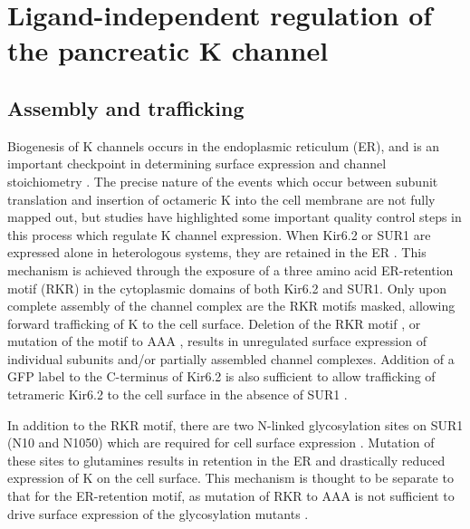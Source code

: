 \section{Ligand-independent regulation of the pancreatic K\ATP{} channel}

\subsection{Assembly and trafficking}

Biogenesis of K\ATP{} channels occurs in the endoplasmic reticulum (ER), and is an important checkpoint in determining surface expression and channel stoichiometry \cite{zerangue_new_1999-1, martin_pharmacological_2013}.
The precise nature of the events which occur between subunit translation and insertion of octameric K\ATP{} into the cell membrane are not fully mapped out, but studies have highlighted some important quality control steps in this process which regulate K\ATP{} channel expression.
When Kir6.2 or SUR1 are expressed alone in heterologous systems, they are retained in the ER \cite{zerangue_new_1999-1}.
This mechanism is achieved through the exposure of a three amino acid ER-retention motif (RKR) in the cytoplasmic domains of both Kir6.2 and SUR1.
Only upon complete assembly of the channel complex are the RKR motifs masked, allowing forward trafficking of K\ATP{} to the cell surface.
Deletion of the RKR motif \cite{tucker_truncation_1997}, or mutation of the motif to AAA \cite{zerangue_new_1999-1}, results in unregulated surface expression of individual subunits and/or partially assembled channel complexes.
Addition of a GFP label to the C-terminus of Kir6.2 is also sufficient to allow trafficking of tetrameric Kir6.2 to the cell surface in the absence of SUR1 \cite{john_sulphonylurea_1998-1}.

In addition to the RKR motif, there are two N-linked glycosylation sites on SUR1 (N10 and N1050) which are required for cell surface expression \cite{conti_membrane_2002}.
Mutation of these sites to glutamines results in retention in the ER and drastically reduced expression of K\ATP{} on the cell surface.
This mechanism is thought to be separate to that for the ER-retention motif, as mutation of RKR to AAA is not sufficient to drive surface expression of the glycosylation mutants \cite{conti_membrane_2002}.

